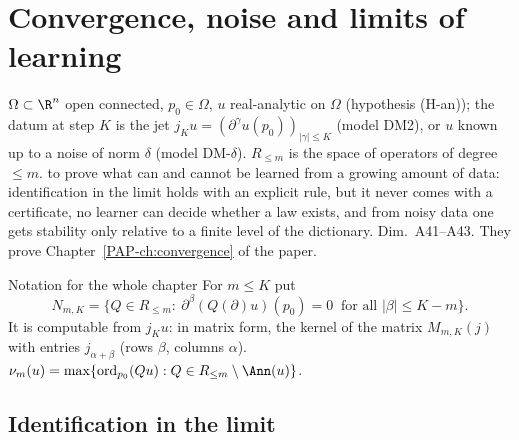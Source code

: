 \chapter[Convergence and noise]{Convergence, noise and limits of learning}\label{ch:cIII3}
\chapterbrief
{$\Omega\subset\R^n$ open connected, $p_0\in\Omega$, $u$ real-analytic on $\Omega$ (hypothesis (H-an)); the datum at step $K$ is the jet $j_Ku=(\partial^\gamma u(p_0))_{|\gamma|\le K}$ (model DM2), or $u$ known up to a noise of norm $\delta$ (model DM-$\delta$). $R_{\le m}$ is the space of operators of degree $\le m$.}
{to prove what can and cannot be learned from a growing amount of data: identification in the limit holds with an explicit rule, but it never comes with a certificate, no learner can decide whether a law exists, and from noisy data one gets stability only relative to a finite level of the dictionary.}
{Dim.~A41--A43. They prove Chapter~\ref{PAP-ch:convergence} of the paper.}

\begin{notebox}{Notation for the whole chapter}
For $m\le K$ put
\[
N_{m,K}=\{Q\in R_{\le m}:\ \partial^\beta(Q(\partial)u)(p_0)=0\ \text{ for all }|\beta|\le K-m\}.
\]
It is computable from $j_Ku$: in matrix form, the kernel of the matrix $M_{m,K}(j)$ with entries $j_{\alpha+\beta}$ (rows $\beta$, columns $\alpha$). $\nu_m(u)=\max\{\mathrm{ord}_{p_0}(Qu):Q\in R_{\le m}\setminus\Ann(u)\}$.
\end{notebox}

\section{Identification in the limit}

